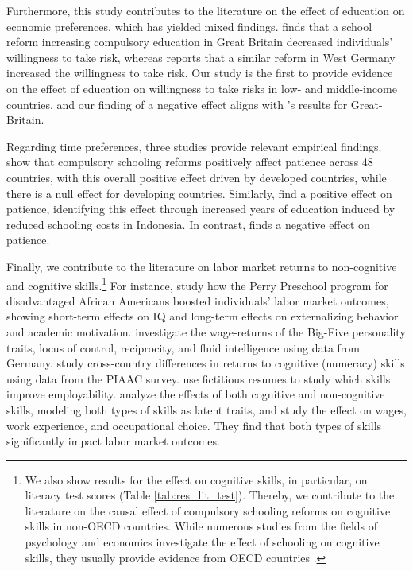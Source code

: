 Furthermore, this study contributes to the literature on the effect of education on economic preferences, which has yielded mixed findings. \citet{jung_does_2015} finds that a school reform increasing compulsory education in Great Britain decreased individuals' willingness to take risk, whereas \citet{tawiah_does_2022} reports that a similar reform in West Germany increased the willingness to take risk. Our study is the first to provide evidence on the effect of education on willingness to take risks in low- and middle-income countries, and our finding of a negative effect aligns with \citeauthor{jung_does_2015}'s \parencite*{jung_does_2015} results for Great-Britain.

Regarding time preferences, three studies provide relevant empirical findings. \citet{dohmen_effect_2022} show that compulsory schooling reforms positively affect patience across 48 countries, with this overall positive effect driven by developed countries, while there is a null effect for developing countries. Similarly, \citet{jung_does_2021} find a positive effect on patience, identifying this effect through increased years of education induced by reduced schooling costs in Indonesia. In contrast, \citet{tawiah_does_2022} finds a negative effect on patience.

Finally, we contribute to the literature on labor market returns to non-cognitive and cognitive skills.\footnote{
	We also show results for the effect on cognitive skills, in particular, on literacy test scores (Table \ref{tab:res_lit_test}). Thereby, we contribute to the literature on the causal effect of compulsory schooling reforms on cognitive skills in non-OECD countries. While numerous studies from the fields of psychology and economics investigate the effect of schooling on cognitive skills, they usually provide evidence from OECD countries \parencite[see, for instance,][]{schneeweis_does_2014, cappellari_effects_2023}.
} For instance, \citet{heckman_understanding_2013} study how the Perry Preschool program for disadvantaged African Americans boosted individuals' labor market outcomes, showing short-term effects on IQ and long-term effects on externalizing behavior and academic motivation. \citet{heineck_returns_2010} investigate the wage-returns of the Big-Five personality traits, locus of control, reciprocity, and fluid intelligence using data from Germany. \citet{hanushek_coping_2017} study cross-country differences in returns to cognitive (numeracy) skills using data from the PIAAC survey. \citet{piopiunik_skills_2020} use fictitious resumes to study which skills improve employability. \citet{heckman_effects_2006} analyze the effects of both cognitive and non-cognitive skills, modeling both types of skills as latent traits, and study the effect on wages, work experience, and occupational choice. They find that both types of skills significantly impact labor market outcomes.


